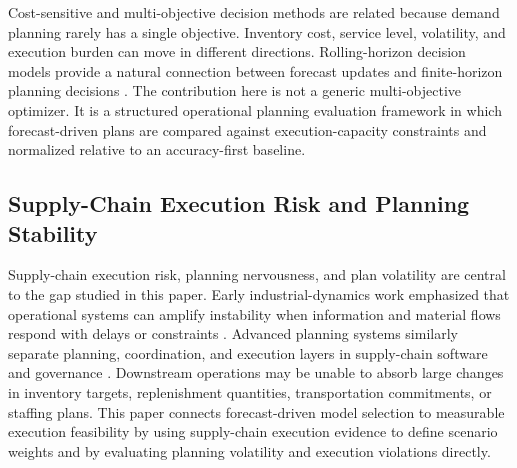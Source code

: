 Cost-sensitive and multi-objective decision methods are related because demand planning rarely has a single objective. Inventory cost, service level, volatility, and execution burden can move in different directions. Rolling-horizon decision models provide a natural connection between forecast updates and finite-horizon planning decisions \citep{sethi1991rolling}. The contribution here is not a generic multi-objective optimizer. It is a structured operational planning evaluation framework in which forecast-driven plans are compared against execution-capacity constraints and normalized relative to an accuracy-first baseline.

\subsection{Supply-Chain Execution Risk and Planning Stability}

Supply-chain execution risk, planning nervousness, and plan volatility are central to the gap studied in this paper. Early industrial-dynamics work emphasized that operational systems can amplify instability when information and material flows respond with delays or constraints \citep{forrester1961industrial}. Advanced planning systems similarly separate planning, coordination, and execution layers in supply-chain software and governance \citep{stadtler2015advanced}. Downstream operations may be unable to absorb large changes in inventory targets, replenishment quantities, transportation commitments, or staffing plans. This paper connects forecast-driven model selection to measurable execution feasibility by using supply-chain execution evidence to define scenario weights and by evaluating planning volatility and execution violations directly.
